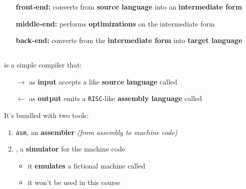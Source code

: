 \documentclass[english]{article}
\begin{document}
\begin{minipage}[m]{0.695\textwidth}
  \begin{enumerate}[leftmargin=*, labelindent=1em, widest*=11]
    \item[\textbf{front-end:}] converts from \textbf{source language} into an \textbf{intermediate form}
    \item[\textbf{middle-end:}] performs \textbf{optimizations} on the intermediate form
    \item[\textbf{back-end:}] converts from the \textbf{intermediate form} into \textbf{target language}
  \end{enumerate}
\end{minipage}
\begin{minipage}[m]{0.3\textwidth}
  \centering
\end{minipage}

\subsection{\acse}

\acse is a simple compiler that:

\begin{itemize}
  \item[\(\rightarrow\)] as \textbf{input} accepts a \clang like \textbf{source language} called \lance
  \item[\(\leftarrow\)] as \textbf{output} emits a \texttt{RISC}-like \textbf{assembly language} called \mace
\end{itemize}

It's bundled with two tools:

\begin{enumerate}
  \item \texttt{asm}, an \textbf{assembler} \textit{(from assembly to machine code)}
  \item \mace, a \textbf{simulator} for the machine code
        \begin{itemize}
          \item it \textbf{emulates} a fictional machine called \mace
          \item it won't be used in this course
        \end{itemize}
\end{enumerate}

\subsubsection{\lance}
\end{document}
